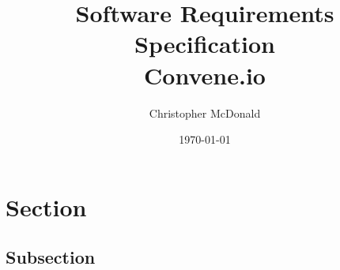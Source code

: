 \documentclass[11pt, oneside]{article}
\title{Software Requirements Specification \\ Convene.io}
\author{Christopher McDonald}
\date{\today}							%
\begin{document}
\maketitle
\section{Section}
\subsection{Subsection}
\end{document}
